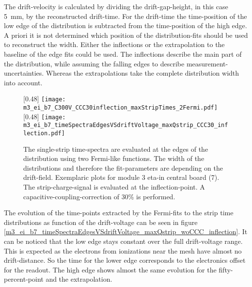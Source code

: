 \documentclass[
twoside,            %
BCOR1.4cm,          %
10pt,               %
headings=normal,    %
headsepline,        %
clearplainpage,		%
final,              %
div=14,
open=right,
bibliography=toc
]{scrreprt}
\begin{document}
The drift-velocity is calculated by dividing the drift-gap-height, in this case \SI{5}{mm}, by the reconstructed drift-time.
For the drift-time the time-position of the low edge of the distribution is subtracted from the time-position of the high edge.
A priori it is not determined which position of the distribution-fits should be used to reconstruct the width.
Either the inflections or the extrapolation to the baseline of the edge fits could be used.
The inflections describe the main part of the distribution, while assuming the falling edges to describe measurement-uncertainties.
Whereas the extrapolations take the complete distribution width into account.

\begin{figure}[!h]
	\centering
	[0.48\textwidth]
	{\texttt{[image: m3\_ei\_b7\_C300V\_CCC30inflection\_maxStripTimes\_2Fermi.pdf]}}
	\hfill
	[0.48\textwidth]
	{\texttt{[image: m3\_ei\_b7\_timeSpectraEdgesVSdriftVoltage\_maxQstrip\_CCC30\_inflection.pdf]}}
	\vspace{-2mm}
	\caption{
		The single-strip time-spectra are evaluated at the edges of the distribution using two Fermi-like functions.
		The width of the distributions and therefore the fit-parameters are depending on the drift-field.
		Exemplaric plots for module 3 eta-in central board (7).
		The strip-charge-signal is evaluated at the inflection-point.
		A capacitive-coupling-correction of 30\% is performed.
	}
\end{figure}

The evolution of the time-points extracted by the Fermi-fits to the strip time distributions as function of the drift-voltage can be seen in figure \ref{m3_ei_b7_timeSpectraEdgesVSdriftVoltage_maxQstrip_woCCC_inflection}.
It can be noticed that the low edge stays constant over the full drift-voltage range.
This is expected as the electrons from ionizations near the mesh have almost no drift-distance. 
So the time for the lower edge corresponds to the electronics offset for the readout.
The high edge shows almost the same evolution for the fifty-percent-point and the extrapolation.
\end{document}
